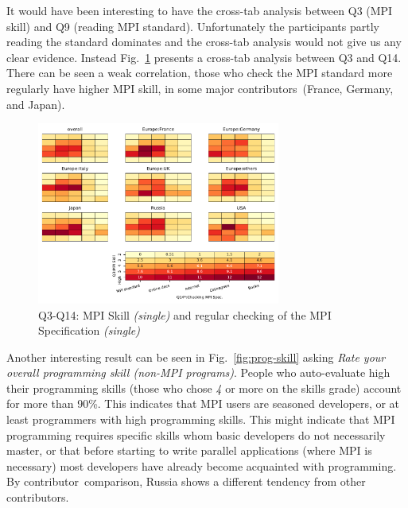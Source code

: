 \documentclass[preprint,5p,times]{elsarticle}
\def\myquote#1{{\it #1}}
\newcommand{\revision}[2]{{\color{blue}#2}}
\def\country{contributor\xspace{}}%
\def\countries{contributors\xspace{}}%
\def\mcountries{major contributors\xspace{}}%
\begin{document}
It would have been interesting to have the cross-tab analysis between Q3 (MPI
skill) and Q9 (reading MPI standard). Unfortunately the participants
\revision{reading the standard partly}{partly reading the standard} dominates and the cross-tab analysis would not give us any clear
evidence.
%
Instead Fig.~\ref{fig:reading-standard-and-checking-spec} presents a cross-tab
analysis between Q3 and Q14. There can be seen a weak correlation, those who
\revision{check more regularly the MPI standard}{check the MPI
  standard more regularly} have higher MPI skill, in some
\mcountries\  (France, Germany, and Japan).

\begin{figure}[tb]
\begin{center}
\includegraphics[width=8.0cm]{Figs/Q3-Q14.pdf}
\caption{Q3-Q14: MPI Skill {\it(single)} and regular checking of the MPI Specification {\it(single)}}
\label{fig:reading-standard-and-checking-spec}
\vspace{-3mm}%
\end{center}
\end{figure}

Another interesting result can be seen in Fig.~\ref{fig:prog-skill} asking
\myquote{Rate your overall programming skill (non-MPI programs)}. People who
auto-evaluate  high their programming skills (\revision{basically }{}those who chose \myquote{4} or
more on the skills grade) account for more than 90\%. This indicates that MPI
users are seasoned developers, or at least programmers with high programming
skills. This might indicate that MPI programming requires specific skills whom
basic developers do not necessarily master, or that before starting to write
parallel applications (where MPI is necessary) most developers have already
become acquainted with programming. By \country\ comparison, Russia shows a
different tendency from other \countries.
\end{document}
